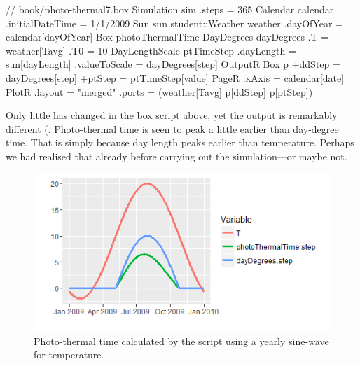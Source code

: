 \lstset{numbers=left}
\begin{boxscript}
// book/photo-thermal7.box
Simulation sim {
  .steps = 365
  Calendar calendar {
    .initialDateTime = 1/1/2009
  }
  Sun sun {
  }
  student::Weather weather {
    .dayOfYear = calendar[dayOfYear]
  }
  Box photoThermalTime {
    DayDegrees dayDegrees {
      .T = weather[Tavg]
      .T0 = 10
    }
    DayLengthScale ptTimeStep {
      .dayLength = sun[dayLength]
      .valueToScale = dayDegrees[step]
    }
  }
  OutputR {
    Box p {
      +ddStep = dayDegrees[step]
      +ptStep = ptTimeStep[value]
    }
    PageR {
      .xAxis = calendar[date]
      PlotR {
        .layout = "merged"
        .ports = (weather[Tavg] p[ddStep] p[ptStep])
      }
    }
  }
}
\end{boxscript}
\lstset{numbers=none}

Only little has changed in the box script above, yet the output is remarkably different (. Photo-thermal time is seen to peak a little earlier than day-degree time. That is simply because day length peaks earlier than temperature. Perhaps we had realised that already before carrying out the simulation---or maybe not.

\begin{figure}
\centering
\includegraphics[width=\textwidth]{graphics/photo-thermal-plot2}
\caption{Photo-thermal time calculated by the  script using a yearly sine-wave for temperature.}
\label{fig:photo-thermal-plot2}
\end{figure}
